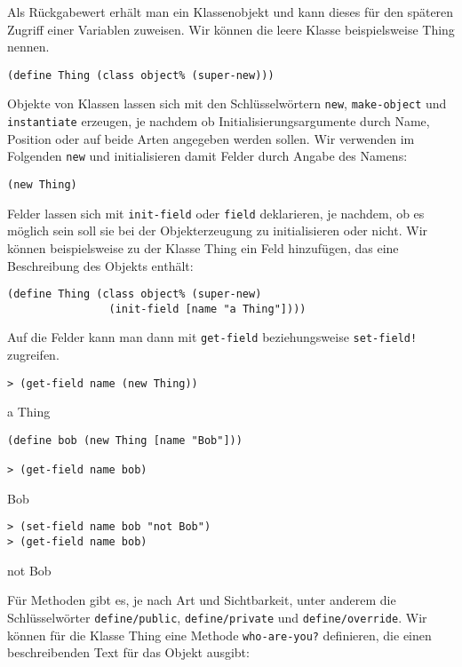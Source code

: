 Als Rückgabewert erhält man ein Klassenobjekt und kann dieses für den späteren Zugriff einer Variablen zuweisen. Wir können die leere Klasse beispielsweise Thing nennen.

\begin{lstlisting}
(define Thing (class object% (super-new)))
\end{lstlisting}

Objekte von Klassen lassen sich mit den Schlüsselwörtern \texttt{new}, \texttt{make-object} und \texttt{instantiate} erzeugen, je nachdem ob Initialisierungsargumente durch Name, Position oder auf beide Arten angegeben werden sollen. Wir verwenden im Folgenden \texttt{new} und initialisieren damit Felder durch Angabe des Namens:

\begin{lstlisting}
(new Thing)
\end{lstlisting}

Felder lassen sich mit \texttt{init-field} oder \texttt{field} deklarieren, je nachdem, ob es möglich sein soll sie bei der Objekterzeugung zu initialisieren oder nicht. Wir können beispielsweise zu der Klasse Thing ein Feld hinzufügen, das eine Beschreibung des Objekts enthält:

\begin{lstlisting}
(define Thing (class object% (super-new)
                (init-field [name "a Thing"])))
\end{lstlisting}

Auf die Felder kann man dann mit \texttt{get-field} beziehungsweise \texttt{set-field!} zugreifen. 

\begin{lstlisting}
> (get-field name (new Thing))
\end{lstlisting}
{\routput {\qq}a Thing{\qq}}

\begin{lstlisting}
(define bob (new Thing [name "Bob"]))

> (get-field name bob)
\end{lstlisting}
{\routput {\qq}Bob{\qq}}

\begin{lstlisting}
> (set-field name bob "not Bob")
> (get-field name bob)
\end{lstlisting}
{\routput {\qq}not Bob{\qq}}

Für Methoden gibt es, je nach Art und Sichtbarkeit, unter anderem die Schlüsselwörter \texttt{define/public}, \texttt{define/private} und \texttt{define/override}. Wir können für die Klasse Thing eine Methode \texttt{who-are-you?} definieren, die einen beschreibenden Text für das Objekt ausgibt:

